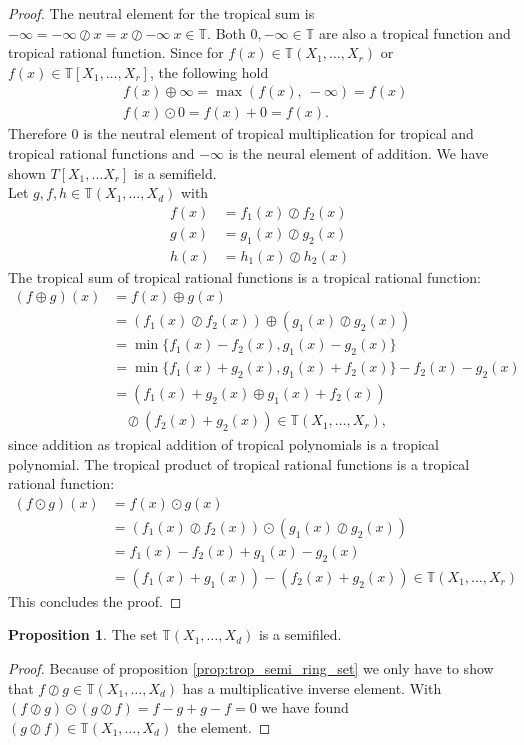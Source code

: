 \documentclass{article}
\theoremstyle{definition}
\newtheorem{proposition}[theorem]{Proposition}
\begin{document}
\begin{proof}
The neutral element for the tropical sum is $- \infty = - \infty \oslash x = x \oslash - \infty \ x \in \mathbb{T}$. Both $0, -\infty \in \mathbb{T}$ are also a tropical function and tropical rational function. Since for $f(x) \in \mathbb{T}(X_1, \dots , X_r)$ or $f(x) \in \mathbb{T}[X_1, \dots , X_r]$, the following hold
\begin{align*}
&f(x) \oplus \infty = \max(f(x),\ - \infty) = f(x) \\
&f(x) \odot 0 = f(x) + 0 = f(x).
\end{align*} 
Therefore $0$ is the neutral element of tropical multiplication for tropical and tropical rational functions and $-\infty$ is the neural element of addition. We have shown $T[X_1, \dots X_r]$ is a semifield. \\ 
Let $g,f,h \in \mathbb{T}(X_1, \dots ,X_d)$ with 
\begin{align*}
f(x) &= f_1(x) \oslash f_2(x) \\
g(x) &= g_1(x) \oslash g_2(x) \\
h(x) &= h_1(x) \oslash h_2(x)
\end{align*}
The tropical sum of tropical rational functions is a tropical rational function:
\begin{align*}
(f \oplus g)(x) &= f(x) \oplus g(x) \\
&=(f_1(x) \oslash f_2(x)) \oplus (g_1(x) \oslash g_2(x)) \\
&= \min\{f_1(x) - f_2(x), g_1(x) - g_2(x) \} \\
&= \min\{f_1(x) + g_2(x), g_1(x) + f_2(x) \} - f_2(x) - g_2(x) \\
&= (f_1(x) + g_2(x) \oplus g_1(x) + f_2(x)) \\
& \ \ \ \ \oslash (f_2(x) + g_2(x)) \in \mathbb{T}(X_1, \dots , X_r),
\end{align*}
since addition as tropical addition of tropical polynomials is a tropical polynomial.
The tropical product of tropical rational functions is a tropical rational function:
\begin{align*}
(f \odot g)(x) &= f(x) \odot g(x) \\
&=  (f_1(x) \oslash f_2(x)) \odot (g_1(x) \oslash g_2(x)) \\
&= f_1(x) - f_2(x) + g_1(x) - g_2(x) \\
&= (f_1(x) + g_1(x)) - (f_2(x) + g_2(x)) \in \mathbb{T}(X_1, \dots , X_r)
\end{align*}
This concludes the proof.
\end{proof}

\begin{proposition}
The set $\mathbb{T}(X_1, \dots , X_d)$ is a semifiled.
\end{proposition}
\begin{proof}
Because of proposition \ref{prop:trop_semi_ring_set} we only have to show that $f \oslash g \in \mathbb{T}(X_1, \dots , X_d)$ has a multiplicative inverse element. With $(f \oslash g) \odot (g \oslash f) = f - g + g - f = 0$ we have found $(g \oslash f) \in \mathbb{T}(X_1, \dots , X_d)$ the element.
\end{proof}
\end{document}
